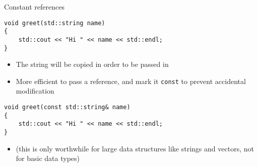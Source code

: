 \begin{frame}[fragile]{Constant references}
    \begin{lstlisting}
void greet(std::string name)
{
    std::cout << "Hi " << name << std::endl;
}
    \end{lstlisting}
    \pause
    \begin{itemize}
        \item The string will be copied in order to be passed in \pause
        \item More efficient to pass a reference, and mark it \lstinline{const} to prevent accidental modification
    \end{itemize}
    \begin{lstlisting}
void greet(const std::string& name)
{
    std::cout << "Hi " << name << std::endl;
}
    \end{lstlisting}
    \pause
    \begin{itemize}
        \item (this is only worthwhile for large data structures like strings and vectors, not for basic data types)
    \end{itemize}
\end{frame}

